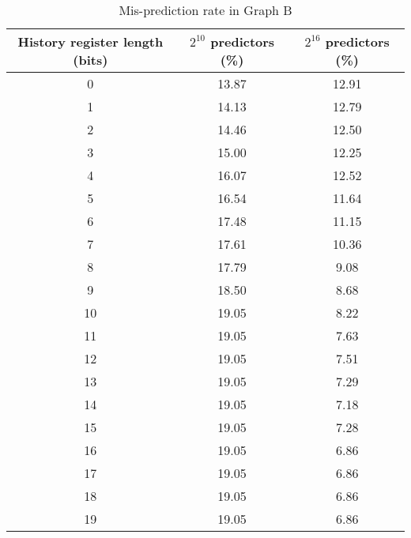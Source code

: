 \documentclass[12pt,letterpaper]{article}
\begin{document}
\begin{table}[!ht]
\caption{Mis-prediction rate in Graph B}
\centering
\begin{tabular}{|c|c|c|}
\hline 
History register length (bits) & $2^{10}$ predictors (\%) & $2^{16}$ 
predictors (\%) \\ 
\hline 
0 & 13.87 & 12.91 \\ 
\hline 
1 & 14.13 & 12.79 \\ 
\hline 
2 & 14.46 & 12.50 \\ 
\hline 
3 & 15.00 & 12.25 \\ 
\hline 
4 & 16.07 & 12.52 \\ 
\hline 
5 & 16.54 & 11.64 \\ 
\hline 
6 & 17.48 & 11.15 \\ 
\hline 
7 & 17.61 & 10.36 \\ 
\hline 
8 & 17.79 & 9.08 \\ 
\hline 
9 & 18.50 & 8.68 \\ 
\hline 
10 & 19.05 & 8.22 \\ 
\hline 
11 & 19.05 & 7.63 \\ 
\hline 
12 & 19.05 & 7.51 \\ 
\hline 
13 & 19.05 & 7.29 \\ 
\hline 
14 & 19.05 & 7.18 \\ 
\hline 
15 & 19.05 & 7.28 \\ 
\hline 
16 & 19.05 & 6.86 \\ 
\hline 
17 & 19.05 & 6.86 \\ 
\hline 
18 & 19.05 & 6.86 \\ 
\hline 
19 & 19.05 & 6.86 \\ 
\hline 
\end{tabular} 
\end{table}
\end{document}
